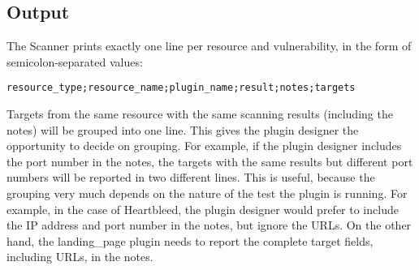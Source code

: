 \subsection{Output}
The Scanner prints exactly one line per resource and vulnerability, in the form of semicolon-separated values:
\begin{verbatim}
resource_type;resource_name;plugin_name;result;notes;targets
\end{verbatim}
Targets from the same resource with the same scanning results (including the notes) will be grouped into one line. This gives the plugin designer the opportunity to decide on grouping. For example, if the plugin designer includes the port number in the notes, the targets with the same results but different port numbers will be reported in two different lines. This is useful, because the grouping very much depends on the nature of the test the plugin is running. For example, in the case of Heartbleed, the plugin designer would prefer to include the IP address and port number in the notes, but ignore the URLs. On the other hand, the landing\_page plugin needs to report the complete target fields, including URLs, in the notes.
